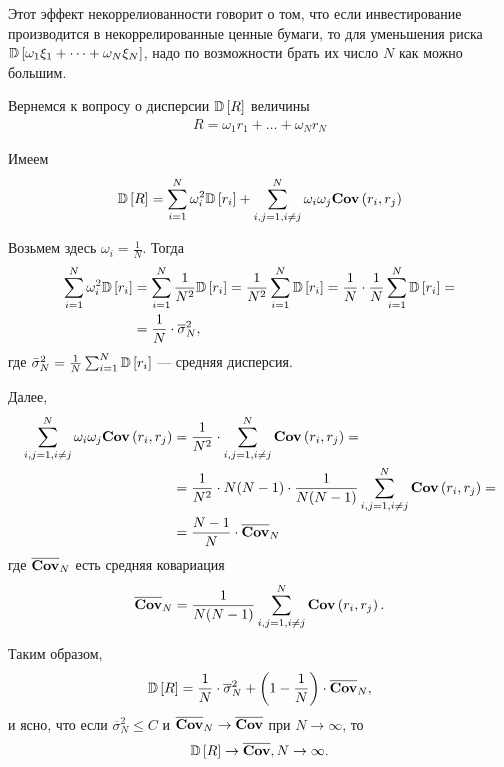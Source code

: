 Этот эффект некоррелиованности говорит о том, что если инвестирование производится в некоррелированные ценные бумаги, то для уменьшения риска
$\mathbb{D}\left[\omega_1 \xi_1 + \dots + \omega_N \xi_N\right]$, надо по возможности брать их число $N$ как можно большим.

Вернемся к вопросу о дисперсии $\mathbb{D}\left[R\right]$ величины
\begin{align}
	R = \omega_1 r_1 + \dots + \omega_N r_N
\end{align}

Имеем
\begin{align}
	\mathbb{D}\left[R\right] = \sum_{i=1}^{N} \omega_i^2 \mathbb{D}\left[r_i\right] + \sum_{i, j = 1, i \ne j}^{N} \omega_i \omega_j \textbf{Cov}\left(r_i, r_j\right)
\end{align}

Возьмем здесь $\omega_i = \frac{1}{N}$. Тогда
\begin{align}
	\sum_{i=1}^{N} \omega_i^2 \mathbb{D}\left[r_i\right]
	&= \sum_{i=1}^{N} \frac{1}{N^2} \mathbb{D}\left[r_i\right]
	= \frac{1}{N^2} \sum_{i=1}^{N} \mathbb{D}\left[r_i\right]
	= \frac{1}{N} \cdot \frac{1}{N} \sum_{i=1}^{N} \mathbb{D}\left[r_i\right] = \\
	&= \frac{1}{N} \cdot \overline{\sigma}_N^2 ,
\end{align}
где $\bar{\sigma}_N^2 = \frac{1}{N} \sum_{i=1}^{N} \mathbb{D}\left[r_i\right]$ --- средняя дисперсия. 

Далее,
\begin{align}
	\sum_{i, j = 1, i \ne j}^{N} \omega_i \omega_j \textbf{Cov}\left(r_i, r_j\right)
	&= \frac{1}{N^2} \cdot \sum_{i, j = 1, i \ne j}^{N} \textbf{Cov}\left(r_i, r_j\right) = \\
	&= \frac{1}{N^2} \cdot N (N-1) \cdot \frac{1}{N (N-1)} \sum_{i, j = 1, i \ne j}^{N} \textbf{Cov}\left(r_i, r_j\right) = \\
	&= \frac{N-1}{N} \cdot \overline{\textbf{Cov}}_N
\end{align}
где $\overline{\textbf{Cov}}_N$ есть средняя ковариация
\begin{align}
\overline{\textbf{Cov}}_N = \frac{1}{N (N - 1)} \sum_{i, j = 1, i \ne j}^{N} \textbf{Cov}\left(r_i, r_j\right) .
\end{align}

Таким образом,
\begin{align} \label{eq:DR_decomposition}
	\mathbb{D}\left[R\right] = \frac{1}{N} \cdot \overline{\sigma}_N^2 + \left(1 - \frac{1}{N}\right) \cdot \overline{\textbf{Cov}}_N ,
\end{align}
и ясно, что если $\overline{\sigma}_N^2 \le C$ и $\overline{\textbf{Cov}}_N \rightarrow \overline{\textbf{Cov}}$ при $N \rightarrow \infty$, то
\begin{align}
	\mathbb{D}\left[R\right] \rightarrow \overline{\textbf{Cov}}, N \rightarrow \infty .
\end{align}

